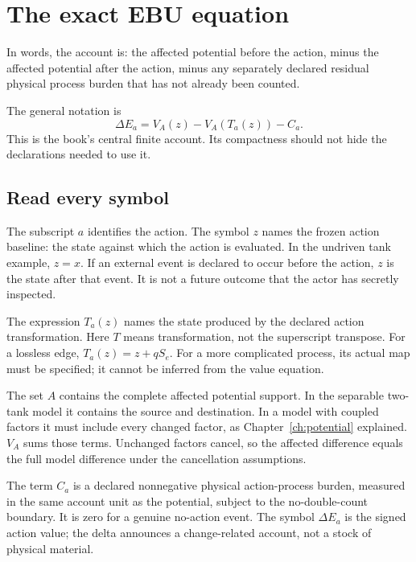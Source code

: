 \chapter{The exact EBU equation}\label{ch:ebu}

In words, the account is: the affected potential before the action, minus the affected potential after the action, minus any separately declared residual physical process burden that has not already been counted.

The general notation is
\begin{equation}\label{eq:ebu}
 \boxed{\Delta E_a=V_A(z)-V_A(T_a(z))-C_a.}
\end{equation}
This is the book's central finite account. Its compactness should not hide the declarations needed to use it.\cite{foundation,gaussian}

\section{Read every symbol}
The subscript $a$ identifies the action. The symbol $z$ names the frozen action baseline: the state against which the action is evaluated. In the undriven tank example, $z=x$. If an external event is declared to occur before the action, $z$ is the state after that event. It is not a future outcome that the actor has secretly inspected.

The expression $T_a(z)$ names the state produced by the declared action transformation. Here $T$ means transformation, not the superscript transpose. For a lossless edge, $T_a(z)=z+qS_e$. For a more complicated process, its actual map must be specified; it cannot be inferred from the value equation.

The set $A$ contains the complete affected potential support. In the separable two-tank model it contains the source and destination. In a model with coupled factors it must include every changed factor, as Chapter~\ref{ch:potential} explained. $V_A$ sums those terms. Unchanged factors cancel, so the affected difference equals the full model difference under the cancellation assumptions.

The term $C_a$ is a declared nonnegative physical action-process burden, measured in the same account unit as the potential, subject to the no-double-count boundary. It is zero for a genuine no-action event. The symbol $\Delta E_a$ is the signed action value; the delta announces a change-related account, not a stock of physical material.

